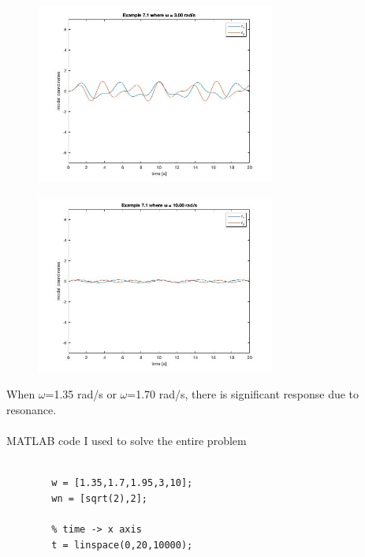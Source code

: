 \documentclass{article}
\begin{document}
\begin{enumerate}
        \begin{figure}[H]
        \vspace{-10pt}
        \includegraphics[width=0.7\textwidth,left]{MCHE 6390/HW03/Figures/Figure 3 - 3rad.jpg}
        \label{fig:Modal_Response_4_3}
        \end{figure}
        
        \begin{figure}[H]
        \vspace{-10pt}
        \includegraphics[width=0.7\textwidth,left]{MCHE 6390/HW03/Figures/Figure 3 - 10rad.jpg}
        \label{fig:Modal_Response_4_10}
        \end{figure}
    When $\omega$=1.35 rad/s or $\omega$=1.70 rad/s, there is significant response due to resonance.
    \\
    \\
    MATLAB code I used to solve the entire problem
        \begin{lstlisting}[style=Matlab-editor]
        % Defines w and w_n -> given
        
        w = [1.35,1.7,1.95,3,10];
        wn = [sqrt(2),2];
        
        % time -> x axis
        t = linspace(0,20,10000);
        

\end{lstlisting}
\end{enumerate}
\end{document}
